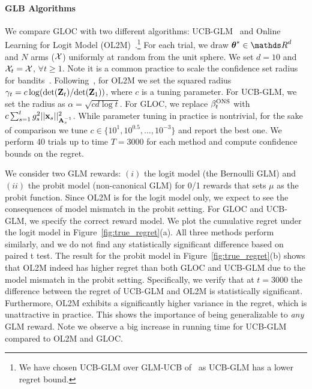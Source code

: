 \paragraph{GLB Algorithms}
%
We compare GLOC with two different algorithms: UCB-GLM~\cite{li17provable} and Online Learning for Logit Model (OL2M)~\cite{zhang16online}.\footnote{We have chosen UCB-GLM over GLM-UCB of~\citet{filippi10parametric} as UCB-GLM has a lower regret bound.} %
For each trial, we draw $\th^*\in\dsR^d$ and $N$ arms ($\mathcal{X}$) uniformly at random from the unit sphere.
We set $d=10$ and $\mathcal{X}_t = \mathcal{X}$, $\forall t\ge1$.
Note it is a common practice to scale the confidence set radius for bandits~\cite{chapelle11anempirical,li12anunbiased}.
Following~\citet{zhang16online}, for OL2M we set the squared radius $\gamma_t = c \log(\mbox{det}(\mathbf{Z}_t)/\mbox{det}(\mathbf{Z}_1))$, where $c$ is a tuning parameter.
For UCB-GLM, we set the radius as $\alpha = \sqrt{c d\log t}$.
For GLOC, we replace $\beta^{\text{\normalfont ONS}}_t$ with $c \sum_{s=1}^t g_s^2 ||\mathbf{x}_s||^2_{\mathbf{A}_s^{-1}}$.
While parameter tuning in practice is nontrivial, for the sake of comparison we tune $c \in \{10^1, 10^{0.5}, \ldots, 10^{-3}\}$ and report the best one.
We perform 40 trials up to time $T=3000$ for each method and compute confidence bounds on the regret.

We consider two GLM rewards: $(i)$ the logit model (the Bernoulli GLM) and $(ii)$ the probit model (non-canonical GLM) for 0/1 rewards that sets $\mu$ as the probit function.
Since OL2M is for the logit model only, we expect to see the consequences of model mismatch in the probit setting. 
For GLOC and UCB-GLM, we specify the correct reward model.
We plot the cumulative regret under the logit model in Figure~\ref{fig:true_regret}(a).
All three methods perform similarly, and we do not find any statistically significant difference based on paired t test.
The result for the probit model in Figure~\ref{fig:true_regret}(b) shows that OL2M indeed has higher regret than both GLOC and UCB-GLM due to the model mismatch in the probit setting.
Specifically, we verify that at $t=3000$ the difference between the regret of UCB-GLM and OL2M is statistically significant.
Furthermore, OL2M exhibits a significantly higher variance in the regret, which is unattractive in practice.
This shows the importance of being generalizable to \emph{any} GLM reward. 
Note we observe a big increase in running time for UCB-GLM compared to OL2M and GLOC.

\vspace{-6pt}
